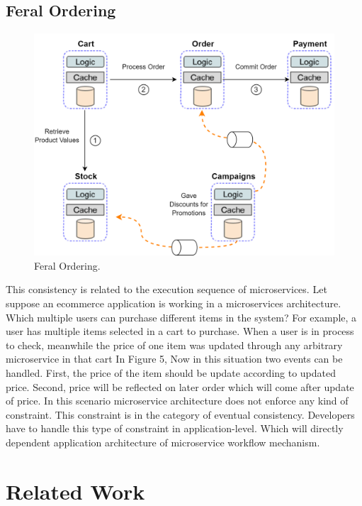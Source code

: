 \documentclass[a4paper,12pt]{article}
\begin{document}
\subsection{Feral Ordering}
\begin{figure}[h!]
    \begin{center}
	    \includegraphics[width=0.7\columnwidth]{img/Feral.png}
    \end{center}
	\caption{Feral Ordering.}
	\label{fig:microarch}
\end{figure}
This consistency is related to the execution sequence of microservices. Let suppose an ecommerce application is working in a microservices architecture. Which multiple users can purchase different items in the system? For example, a user has multiple items selected in a cart to purchase. When a user is in process to check, meanwhile the price of one item was updated through any arbitrary microservice in that cart In Figure 5, Now in this situation two events can be handled. First, the price of the item should be update according to updated price. Second, price will be reflected on later order which will come after update of price.
In this scenario microservice architecture does not enforce any kind of constraint. This constraint is in the category of eventual consistency. Developers have to handle this type of constraint in application-level. Which will directly dependent application architecture of microservice workflow mechanism. \cite{one, three, twentyfour}

\section{Related Work}
\end{document}
